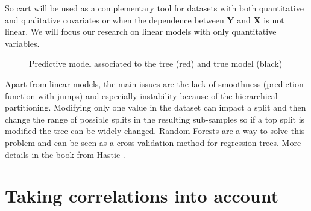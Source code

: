 \documentclass[12pt,a4paper]{report}
\begin{document}
		So {\sc cart} will be used as a complementary tool for datasets with both quantitative and qualitative covariates or when the dependence between $\boldsymbol{Y}$ and $\boldsymbol{X}$ is not linear. We will focus our research on linear models with only quantitative variables.
	\\
	
\begin{figure}[h!]
	\caption{Predictive model associated to the tree (red) and true model (black)}\label{arbretrivial}
\end{figure}

 Apart from linear models, the main issues are the lack of smoothness (prediction function with jumps) and especially instability because of the hierarchical partitioning. Modifying only one value in the dataset can impact a split and then change the range of possible splits in the resulting sub-samples so if a top split is modified the tree can be widely changed. Random Forests are a way to solve this problem and can be seen as a cross-validation method for regression trees. More details in the book from Hastie \cite{hastie2009elements}.	
	
	
		\FloatBarrier
			
	\section{Taking correlations into account}		%
\end{document}
